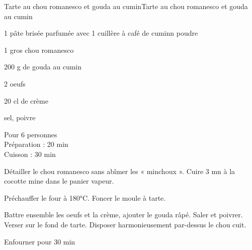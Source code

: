 \begin{recette}{Tarte au chou romanesco et gouda au cumin}{Tarte au chou romanesco et gouda au cumin}

\begin{ingredients}
1 pâte brisée parfumée avec 1 cuillère à café de cuminn poudre\par
1 gros chou romanesco\par
200 g de gouda au cumin\par
2 oeufs\par
20 cl de crème\par
sel, poivre\par
\end{ingredients}

\begin{infos}
Pour 6 personnes	\\
Préparation : 20 min\\
Cuisson : 30 min\\
\end{infos}

\begin{etapes}
\item Détailler le chou romanesco sans abîmer les « minchoux ». Cuire 3 mn à la cocotte mine dans le panier vapeur.
\item Préchauffer le four à 180°C. Foncer le moule à tarte.
\item Battre ensemble les oeufs et la crème, ajouter le gouda râpé. Saler et poivrer. Verser sur le fond de tarte. Disposer harmonieusement par-dessus le chou cuit.
\item Enfourner pour 30 min
\end{etapes}

\end{recette}